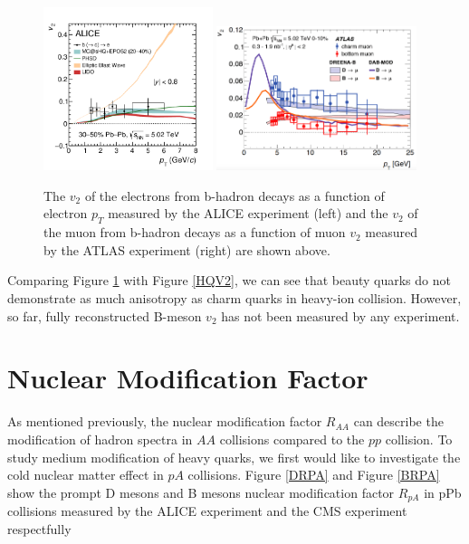 \begin{figure}[hbtp]
\begin{center}
\includegraphics[width=0.44\textwidth]{Figures/Chapter2/ALICENPEv2.png}
\includegraphics[width=0.52\textwidth]{Figures/Chapter2/ATLASNPMUv2.png}
\caption{The $v_2$ of the electrons from b-hadron decays as a function of electron $p_T$ measured by the ALICE experiment (left) and the $v_2$ of the muon from b-hadron decays as a function of muon $v_2$ measured by the ATLAS experiment (right) are shown above.}
\label{BeautyEV2}
\end{center}
\end{figure}   


Comparing Figure \ref{BeautyEV2} with Figure \ref{HQV2}, we can see that beauty quarks do not demonstrate as much anisotropy as charm quarks in heavy-ion collision. However, so far, fully reconstructed B-meson $v_2$ has not been measured by any experiment. 



\section{Nuclear Modification Factor}

As mentioned previously, the nuclear modification factor $R_{AA}$ can describe the modification of hadron spectra in $AA$ collisions compared to the $pp$ collision. To study medium modification of heavy quarks, we first would like to investigate the cold nuclear matter effect in $pA$ collisions. Figure \ref{DRPA} and Figure \ref{BRPA} show the prompt D mesons and B mesons nuclear modification factor $R_{pA}$ in pPb collisions measured by the ALICE experiment \cite{ALICEDRPARef} and the CMS experiment \cite{CMSBRPARef} respectfully 



